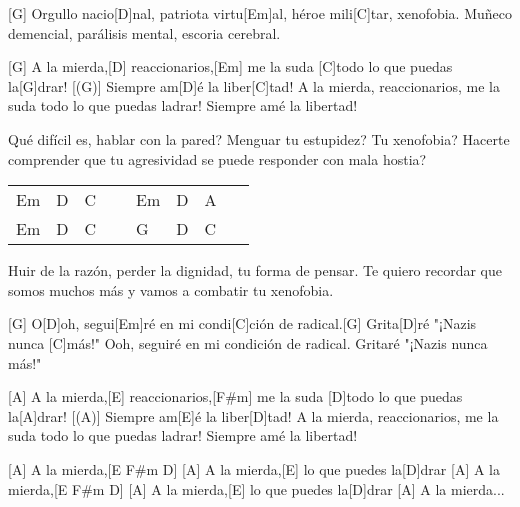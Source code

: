 

\hfill{}

\begin{guitar}
	[G] Orgullo nacio[D]nal, patriota virtu[Em]al, héroe mili[C]tar, xenofobia.
	Muñeco demencial, parálisis mental, escoria cerebral.
	
	[G] A la mierda,[D] reaccionarios,[Em] me la suda [C]todo lo que puedas la[G]drar!
	[(G)] Siempre am[D]{é} la liber[C]tad!
	A la mierda, reaccionarios, me la suda todo lo que puedas ladrar!
	Siempre amé la libertad!
	
	Qué difícil es, hablar con la pared? Menguar tu estupidez? Tu xenofobia?
	Hacerte comprender que tu agresividad se puede responder con mala hostia?
	
	 
	
	 {\footnotesize\begin{tabular}{|ll|ll|ll|ll|}
			Em & D & C & ~ & Em & D & A & ~ \\
			Em & D & C & ~ & G & D & C & ~
	\end{tabular}}
	
	Huir de la razón, perder la dignidad, tu forma de pensar.
	Te quiero recordar que somos muchos más y vamos a combatir tu xenofobia.
	
	 
	
	
	[G] O[D]oh, segui[Em]ré en mi condi[C]ción de radical.[G] Grita[D]ré "¡Nazis nunca [C]más!"
	 Ooh, seguiré en mi condición de radical. Gritaré "¡Nazis nunca más!"
	
	[A] A la mierda,[E] reaccionarios,[F#m] me la suda [D]todo lo que puedas la[A]drar!
	[(A)] Siempre am[E]{é} la liber[D]tad!
	A la mierda, reaccionarios, me la suda todo lo que puedas ladrar!
	Siempre amé la libertad!
	
	\pagebreak
	[A] A la mierda,[E F#m D]{}
	[A] A la mierda,[E] lo que puedes la[D]drar
	[A] A la mierda,[E F#m D]{}
	[A] A la mierda,[E] lo que puedes la[D]drar
	[A] A la mierda...
\end{guitar}
